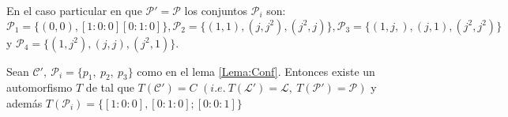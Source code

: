 En el caso particular en que $\mathcal{P}'=\mathcal{P}$ los conjuntos $\mathcal{P}_{i}$ son: $\mathcal{P}_{1}=\{ (0,0),[1:0:0][0:1:0]\}, \mathcal{P}_{2}=\{(1,1),(j,j^{2}),(j^{2},j)\}, \mathcal{P}_{3}=\{(1,j,),(j,1),(j^{2},j^{2})\}$ y $\mathcal{P}_{4}=\{(1,j^{2}),(j,j),(j^{2},1)\}$.\\


\begin{Proposicion}
\label{Prop:1}
Sean $\mathcal{C'},\ \mathcal{P}_{i} = \{p_{1},\ p_{2},\ p_{3} \}$ como en el lema \ref{Lema:Conf}. Entonces existe un automorfismo $T$ de \CP tal que $T(\mathcal{C'})=C$ $(\mathit{i.e.}\ T(\mathcal{L'}) = \mathcal{L},\ T(\mathcal{P'}) = \mathcal{P})$ y además $ T(\mathcal{P}_{i}) = \{ [1:0:0],[0:1:0];[0:0:1] \}$

\end{Proposicion}

